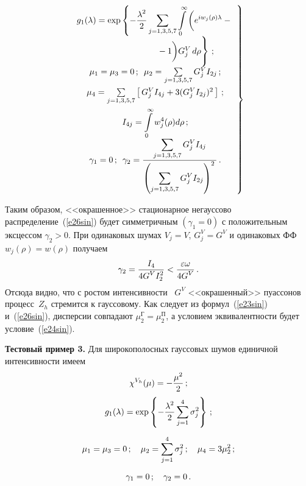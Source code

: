 \begin{multicols}{2}
\noindent
    \begin{equation}
\!\!    \left.
 \begin{array}{c}
 g_1(\lambda) =\displaystyle  
 \exp\left \{ -\fr{\lambda^2}{2} \sss_{j=1,3,5,7} \iii_0^\infty \bigg ( e^{iw_j(\rho)\lambda} -{}\right.\\[12pt]
\quad\quad\quad\quad\quad\quad\quad\left. {}-1 \bigg ) 
    G_j^V\, d\rho\vphantom{\fr{\lambda^2}{2} \sss_{j=1,3,5,7} \iii_0^\infty \bigg ( e^{iw_j(\rho)\lambda}}
    \right \}\,;\\[12pt]
    \mu_1=\mu_3=0\,;\enskip \mu_2 =\sss_{j=1,3,5,7} G_j^V I_{2j}\,;\\[12pt]
    \mu_4 = \sss_{j=1,3,5,7} \lk G_j^V I_{4j} + 3 (G_j^V I_{2j})^2\rk\,;\\[12pt]
    I_{4j} =\displaystyle \iii_0^\infty w_j^4 (\rho) d\rho\,;\\[12pt]
    \gamma_1=0\,;\enskip \gamma_2 = \fr{\sss_{j=1,3,5,7} G_j^V I_{4j}}{\left( \sss_{j=1,3,5,7} G_j^V I_{2j}\right)^2}\,.
    \end{array}\!
     \right \}\!
     \label{e26sin}
     \end{equation}

Таким образом, <<окрашенное>> стационарное негауссово распределение~(\ref{e26sin}) 
будет симметричным  $(\gamma_1=0)$ с положительным
 эксцессом $\gamma_2>0$. При одинаковых шумах $V_j =V$, $G_j^V = G^V$ и одинаковых ФФ $w_j (\rho) = w(\rho)$ получаем
\begin{equation*}
\gamma_2 =\displaystyle\frac{\displaystyle I_4\mathstrut}{\displaystyle 4 G^V I_2^2 \mathstrut} < \displaystyle\frac{\displaystyle \varepsilon \omega\mathstrut}{\displaystyle 4G^V\mathstrut}\,.
\end{equation*}
Отсюда видно, что с ростом интенсивности~ $G^V$ <<окрашенный>> пу\-ас\-со\-нов процесс~$Z_h$ стремится к гауссовому.
Как следует из формул~(\ref{e23sin}) и~(\ref{e26sin}), дисперсии совпадают $\mu_2^{\mathrm{Г}}=\mu_2^{\mathrm{П}}$,
а условием эквивалентности будет условие~(\ref{e24sin}).

\smallskip

\noindent
\textbf{Тестовый пример 3.}
Для широкополосных гауссовых шумов единичной интенсивности имеем
    \begin{gather*}
    \chi^{V_h} (\mu)=-\displaystyle\frac{\displaystyle \mu^2\mathstrut}{\displaystyle 2\mathstrut}\,;\\
    g_1(\lambda) =\exp\left\{ -\displaystyle\frac{\displaystyle \lambda^2\mathstrut}{\displaystyle 2\mathstrut} \sum\limits_{j=1}^4 \sigma_j^2\right\}\,;\\[6pt]
    \mu_1 =\mu_3 =0\,;\quad \mu_2 =\sum\limits_{j=1}^4 \sigma_j^2\,;\quad \mu_4 = 3 \mu_2^2\,;\\[6pt]
    \gamma_1=0\,; \quad\gamma_2 =0\,.
    \end{gather*}


\end{multicols}

